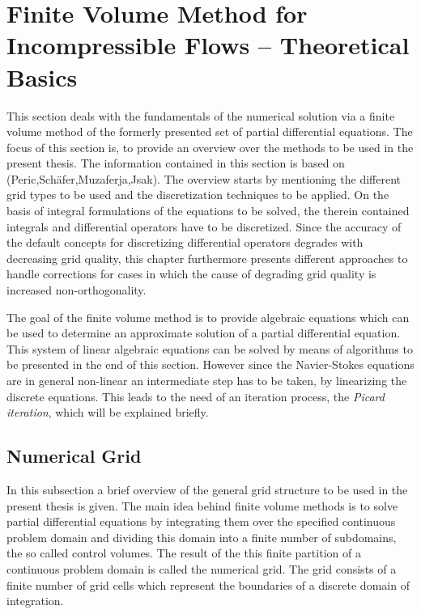   \section{Finite Volume Method for Incompressible Flows -- Theoretical Basics}

  This section deals with the fundamentals of the numerical solution via a finite volume method of the formerly presented set of partial differential equations. The focus of this section is, to provide an overview over the methods to be used in the present thesis. The information contained in this section is based on (Peric,Schäfer,Muzaferja,Jsak). The overview starts by mentioning the different grid types to be used and the discretization techniques to be applied. On the basis of integral formulations of the equations to be solved, the therein contained integrals and differential operators have to be discretized. Since the accuracy of the default concepts for discretizing differential operators degrades with decreasing grid quality, this chapter furthermore presents different approaches to handle corrections for cases in which the cause of degrading grid quality is increased non-orthogonality. 
  
 The goal of the finite volume method is to provide algebraic equations which can be used to determine an approximate solution of a partial differential equation. This system of linear algebraic equations can be solved by means of algorithms to be presented in the end of this section. However since the Navier-Stokes equations are in general non-linear an intermediate step has to be taken, by linearizing the discrete equations. This leads to the need of an iteration process, the \textit{Picard iteration}, which will be explained briefly.
      
  \subsection{Numerical Grid}

    In this subsection a brief overview of the general grid structure to be used in the present thesis is given. The main idea behind finite volume methods is to solve partial differential equations by integrating them over the specified continuous problem domain and dividing this domain into a finite number of subdomains, the so called control volumes. The result of the this finite partition of a continuous problem domain is called the numerical grid. The grid consists of a finite number of grid cells which represent the boundaries of a discrete domain of integration. 


